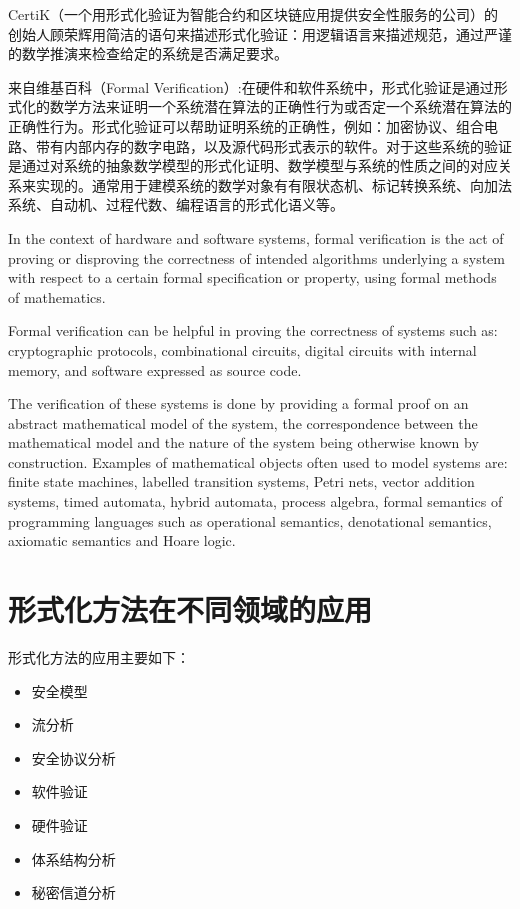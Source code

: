 \documentclass[cs4size,a4pape,UTF8]{ctexart}
\numberwithin{equation}{section}
\numberwithin{table}{section}
\numberwithin{figure}{section}
\begin{document}
CertiK（一个用形式化验证为智能合约和区块链应用提供安全性服务的公司）的创始人顾荣辉用简洁的语句来描述形式化验证：用逻辑语言来描述规范，通过严谨的数学推演来检查给定的系统是否满足要求。

来自维基百科（Formal Verification）:在硬件和软件系统中，形式化验证是通过形式化的数学方法来证明一个系统潜在算法的正确性行为或否定一个系统潜在算法的正确性行为。形式化验证可以帮助证明系统的正确性，例如：加密协议、组合电路、带有内部内存的数字电路，以及源代码形式表示的软件。对于这些系统的验证是通过对系统的抽象数学模型的形式化证明、数学模型与系统的性质之间的对应关系来实现的。通常用于建模系统的数学对象有有限状态机、标记转换系统、向加法系统、自动机、过程代数、编程语言的形式化语义等。

In the context of hardware and software systems, formal verification is the act of proving or disproving the correctness of intended algorithms underlying a system with respect to a certain formal specification or property, using formal methods of mathematics.

Formal verification can be helpful in proving the correctness of systems such as: cryptographic protocols, combinational circuits, digital circuits with internal memory, and software expressed as source code.

The verification of these systems is done by providing a formal proof on an abstract mathematical model of the system, the correspondence between the mathematical model and the nature of the system being otherwise known by construction. Examples of mathematical objects often used to model systems are: finite state machines, labelled transition systems, Petri nets, vector addition systems, timed automata, hybrid automata, process algebra, formal semantics of programming languages such as operational semantics, denotational semantics, axiomatic semantics and Hoare logic\cite{formalverification}.

\newpage
\section{形式化方法在不同领域的应用}
形式化方法的应用主要如下：

\begin{itemize}
\item 安全模型
\item 流分析
\item 安全协议分析
\item 软件验证
\item 硬件验证
\item 体系结构分析
\item 秘密信道分析
\end{itemize}
\end{document}
